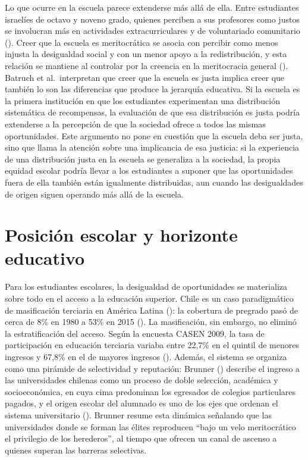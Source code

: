 \documentclass[
  spanish,
  a4paper,
  oneside]{scrbook}
\begin{document}
Lo que ocurre en la escuela parece extenderse más allá de ella. Entre
estudiantes israelíes de octavo y noveno grado, quienes perciben a sus
profesores como justos se involucran más en actividades
extracurriculares y de voluntariado comunitario
(). Creer que la
escuela es meritocrática se asocia con percibir como menos injusta la
desigualdad social y con un menor apoyo a la redistribución, y esta
relación se mantiene al controlar por la creencia en la meritocracia
general ().
Batruch et al.~interpretan que creer que la escuela es justa implica
creer que también lo son las diferencias que produce la jerarquía
educativa. Si la escuela es la primera institución en que los
estudiantes experimentan una distribución sistemática de recompensas, la
evaluación de que esa distribución es justa podría extenderse a la
percepción de que la sociedad ofrece a todos las mismas oportunidades.
Este argumento no pone en cuestión que la escuela deba ser justa, sino
que llama la atención sobre una implicancia de esa justicia: si la
experiencia de una distribución justa en la escuela se generaliza a la
sociedad, la propia equidad escolar podría llevar a los estudiantes a
suponer que las oportunidades fuera de ella también están igualmente
distribuidas, aun cuando las desigualdades de origen siguen operando más
allá de la escuela.

\section{Posición escolar y horizonte
educativo}\label{posiciuxf3n-escolar-y-horizonte-educativo}

Para los estudiantes escolares, la desigualdad de oportunidades se
materializa sobre todo en el acceso a la educación superior. Chile es un
caso paradigmático de masificación terciaria en América Latina
(): la
cobertura de pregrado pasó de cerca de 8\% en 1980 a 53\% en 2015
().
La masificación, sin embargo, no eliminó la estratificación del acceso.
Según la encuesta CASEN 2009, la tasa de participación en educación
terciaria variaba entre 22,7\% en el quintil de menores ingresos y
67,8\% en el de mayores ingresos
(). Además, el sistema
se organiza como una pirámide de selectividad y reputación: Brunner
() describe el ingreso a las
universidades chilenas como un proceso de doble selección, académica y
socioeconómica, en cuya cima predominan los egresados de colegios
particulares pagados, y el origen escolar del alumnado es uno de los
ejes que ordenan el sistema universitario
(). Brunner
resume esta dinámica señalando que las universidades donde se forman las
élites reproducen ``bajo un velo meritocrático el privilegio de los
herederos'', al tiempo que ofrecen un canal de ascenso a quienes superan
las barreras selectivas.
\end{document}
